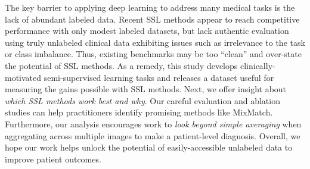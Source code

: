 The key barrier to applying deep learning to address many medical tasks is the lack of abundant labeled data.
Recent SSL methods appear to reach competitive performance with only modest labeled datasets, but lack authentic evaluation using truly unlabeled clinical data exhibiting issues such as irrelevance to the task or class imbalance.
Thus, existing benchmarks may be too ``clean'' and over-state the potential of SSL methods.
As a remedy, this study develops clinically-motivated semi-supervised learning tasks and releases a dataset useful for measuring the gains possible with SSL methods.
Next, we offer insight about \emph{which SSL methods work best and why}.
Our careful evaluation and ablation studies can help practitioners identify promising methods like MixMatch.
Furthermore, our analysis encourages work to \emph{look beyond simple averaging} when aggregating across multiple images to make a patient-level diagnosis.
Overall, we hope our work helps unlock the potential of easily-accessible unlabeled data to improve patient outcomes.


